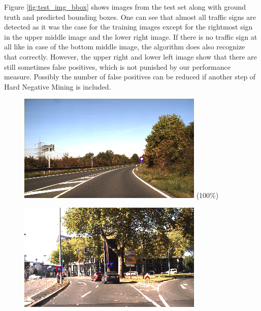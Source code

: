 \documentclass[12pt,a4paper,bibliography=totocnumbered,listof=totocnumbered]{scrartcl}
\begin{document}
Figure \ref{fig:test_img_bbox} shows images from the test set along with ground truth and predicted bounding boxes. One can see that almost all traffic signs are detected as it was the case for the training images except for the rightmost sign in the upper middle image and the lower right image. If there is no traffic sign at all like in case of the bottom middle image, the algorithm does also recognize that correctly. However, the upper right and lower left image show that there are still sometimes false positives, which is not punished by our performance measure. Possibly the number of false positives can be reduced if another step of Hard Negative Mining is included.

\begin{figure}[H]
\begin{minipage}{0.3\textwidth}
\centering
\includegraphics[width=\linewidth]{test2_wb_predboxes2.png}
\small{(100\%)}
\end{minipage}
\hfill
\begin{minipage}{0.3\textwidth}
\centering
\includegraphics[width=\linewidth]{test14_wb_predboxes2.png}

\end{minipage}
\end{figure}
\end{document}
